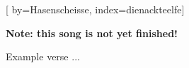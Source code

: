 

[%
    by={Hasenscheisse},
    index={dienackteelfe}]


    \label{dienackteelfe}

    \textbf{Note: this song is not yet finished!}

    \beginverse
        Example verse ...
    \endverse
\endsong
